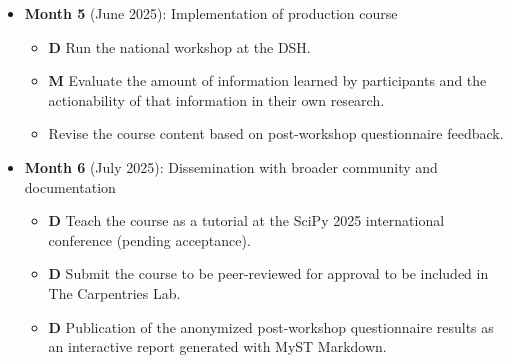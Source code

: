 \documentclass[letterpaper, 11pt]{article}
\newcommand{\milestone}{\textbf{\textrm{M}}}
\newcommand{\deliverable}{\textbf{\textrm{D}}}
\begin{document}
\begin{itemize}
  \item \textbf{Month 5} (June 2025): Implementation of production course
    \begin{itemize}
      \item \deliverable{} Run the national workshop at the DSH.
      \item \milestone{} Evaluate the amount of information learned by participants and the actionability of that information in their own research.
      \item Revise the course content based on post-workshop questionnaire feedback.
    \end{itemize}
  \item \textbf{Month 6} (July 2025): Dissemination with broader community and documentation
    \begin{itemize}
      \item \deliverable{} Teach the course as a tutorial at the SciPy 2025 international conference (pending acceptance).
      \item \deliverable{} Submit the course to be peer-reviewed for approval to be included in The Carpentries Lab.
      \item \deliverable{} Publication of the anonymized post-workshop questionnaire results as an interactive report generated with MyST Markdown.
    \end{itemize}
\end{itemize}

\clearpage
%
\vspace*{-0.25cm}
\begin{footnotesize}
%
 
 
%
\end{footnotesize}
\end{document}
